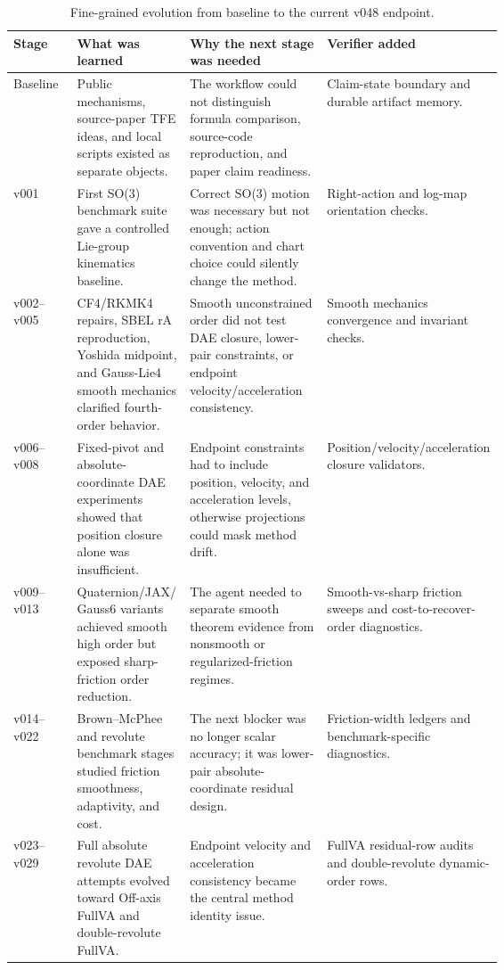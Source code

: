 \documentclass[10pt]{article}
\begin{document}
\begin{table}[H]
\centering
\caption{Fine-grained evolution from baseline to the current v048 endpoint.}
\label{tab:version_detail}
\small
\begin{tabularx}{\linewidth}{p{0.13\linewidth}p{0.23\linewidth}p{0.28\linewidth}Y}
\toprule
\textbf{Stage} & \textbf{What was learned} & \textbf{Why the next stage was needed} & \textbf{Verifier added} \\
\midrule
Baseline & Public mechanisms, source-paper TFE ideas, and local scripts existed as separate objects. & The workflow could not distinguish formula comparison, source-code reproduction, and paper claim readiness. & Claim-state boundary and durable artifact memory. \\
v001 & First SO(3) benchmark suite gave a controlled Lie-group kinematics baseline. & Correct SO(3) motion was necessary but not enough; action convention and chart choice could silently change the method. & Right-action and log-map orientation checks. \\
v002--v005 & CF4/RKMK4 repairs, SBEL rA reproduction, Yoshida midpoint, and Gauss-Lie4 smooth mechanics clarified fourth-order behavior. & Smooth unconstrained order did not test DAE closure, lower-pair constraints, or endpoint velocity/acceleration consistency. & Smooth mechanics convergence and invariant checks. \\
v006--v008 & Fixed-pivot and absolute-coordinate DAE experiments showed that position closure alone was insufficient. & Endpoint constraints had to include position, velocity, and acceleration levels, otherwise projections could mask method drift. & Position/velocity/acceleration closure validators. \\
v009--v013 & Quaternion/JAX/Gauss6 variants achieved smooth high order but exposed sharp-friction order reduction. & The agent needed to separate smooth theorem evidence from nonsmooth or regularized-friction regimes. & Smooth-vs-sharp friction sweeps and cost-to-recover-order diagnostics. \\
v014--v022 & Brown--McPhee and revolute benchmark stages studied friction smoothness, adaptivity, and cost. & The next blocker was no longer scalar accuracy; it was lower-pair absolute-coordinate residual design. & Friction-width ledgers and benchmark-specific diagnostics. \\
v023--v029 & Full absolute revolute DAE attempts evolved toward Off-axis FullVA and double-revolute FullVA. & Endpoint velocity and acceleration consistency became the central method identity issue. & FullVA residual-row audits and double-revolute dynamic-order rows. \\

\end{tabularx}
\end{table}
\end{document}
